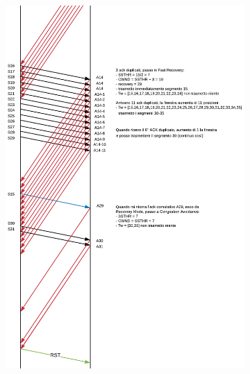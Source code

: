 \documentclass[10pt,a4paper]{article}
\begin{document}
\begin{enumerate}
\begin{figure}[H]
				\begin{subfigure}[b]{9cm}
				  \includegraphics[width=\textwidth]{Esame812019_Conperdite2}
				\end{subfigure}
			  \end{figure}
	\end{enumerate}
	\newpage
\end{document}
